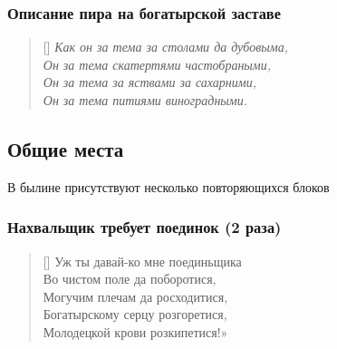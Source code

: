 \documentclass[a4paper, 12pt]{article}
\begin{document}
\subsubsection{Описание пира на богатырской заставе}
\begin{verse}[\versewidth]
\itshape
Как он за тема за столами да дубовыма,\\
Он за тема скатертями частобраными,\\
Он за тема за яствами за сахарними,\\
Он за тема питиями виноградными.
\end{verse}


\subsection{Общие места}
В былине присутствуют несколько повторяющихся блоков

\subsubsection{Нахвальщик требует поединок (2 раза)}
\settowidth{\versewidth}{Богатырскому серцу розгоретися,}
\begin{verse}[\versewidth]
Уж ты давай-ко мне поединьщика\\
Во чистом поле да поборотися,\\
Могучим плечам да росходитися,\\
Богатырскому серцу розгоретися,\\
Молодецкой крови розкипетися!»
\end{verse}
\end{document}
